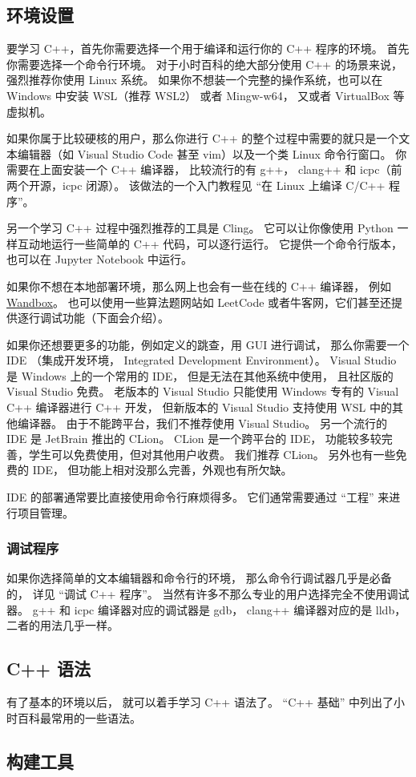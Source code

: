 

\begin{issues}
\issueDraft
\end{issues}

\subsection{环境设置}
要学习 C++，首先你需要选择一个用于编译和运行你的 C++ 程序的环境。 首先你需要选择一个命令行环境。 对于小时百科的绝大部分使用 C++ 的场景来说，强烈推荐你使用 Linux 系统。 如果你不想装一个完整的操作系统，也可以在 Windows 中安装 WSL（推荐 WSL2） 或者 Mingw-w64， 又或者 VirtualBox 等虚拟机。

如果你属于比较硬核的用户，那么你进行 C++ 的整个过程中需要的就只是一个文本编辑器（如 Visual Studio Code 甚至 vim）以及一个类 Linux 命令行窗口。 你需要在上面安装一个 C++ 编译器， 比较流行的有 g++， clang++ 和 icpc（前两个开源，icpc 闭源）。 该做法的一个入门教程见 “在 Linux 上编译 C/C++ 程序”。

另一个学习 C++ 过程中强烈推荐的工具是 Cling。 它可以让你像使用 Python 一样互动地运行一些简单的 C++ 代码，可以逐行运行。 它提供一个命令行版本，也可以在 Jupyter Notebook 中运行。

如果你不想在本地部署环境，那么网上也会有一些在线的 C++ 编译器， 例如 \href{https://wandbox.org/}{Wandbox}。 也可以使用一些算法题网站如 LeetCode 或者牛客网，它们甚至还提供逐行调试功能（下面会介绍）。

如果你还想要更多的功能，例如定义的跳查，用 GUI 进行调试， 那么你需要一个 IDE （集成开发环境， Integrated Development Environment）。 Visual Studio 是 Windows 上的一个常用的 IDE， 但是无法在其他系统中使用， 且社区版的 Visual Studio 免费。 老版本的 Visual Studio 只能使用 Windows 专有的 Visual C++ 编译器进行 C++ 开发， 但新版本的 Visual Studio 支持使用 WSL 中的其他编译器。 由于不能跨平台，我们不推荐使用 Visual Studio。 另一个流行的 IDE 是 JetBrain 推出的 CLion。 CLion 是一个跨平台的 IDE， 功能较多较完善，学生可以免费使用，但对其他用户收费。 我们推荐 CLion。 另外也有一些免费的 IDE， 但功能上相对没那么完善，外观也有所欠缺。

IDE 的部署通常要比直接使用命令行麻烦得多。 它们通常需要通过 “工程” 来进行项目管理。

\subsubsection{调试程序}
如果你选择简单的文本编辑器和命令行的环境， 那么命令行调试器几乎是必备的， 详见 “调试 C++ 程序”。 当然有许多不那么专业的用户选择完全不使用调试器。 g++ 和 icpc 编译器对应的调试器是 gdb， clang++ 编译器对应的是 lldb， 二者的用法几乎一样。

\subsection{C++ 语法}
有了基本的环境以后， 就可以着手学习 C++ 语法了。 “C++ 基础” 中列出了小时百科最常用的一些语法。

\subsection{构建工具}
